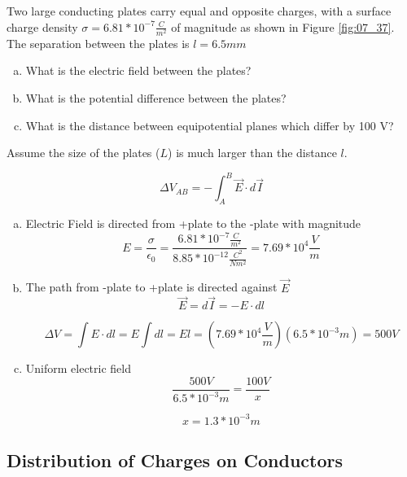 \documentclass[14pt]{memoir}
\begin{document}
Two large conducting plates carry equal and opposite charges, with a surface charge density $\sigma = 6.81 * 10^{-7} \frac{C}{m^2}$ of magnitude as shown in Figure \ref{fig:07_37}. The separation between the plates is $l = 6.5mm$ 
\begin{enumerate}[(a)]
\item What is the electric field between the plates? 
\item What is the potential difference between the plates? 
\item What is the distance between equipotential planes which differ by 100 V?
\end{enumerate}

Assume the size of the plates ($L$) is much larger than the distance $l$.

\begin{equation}
\Delta V_{AB} = - \int_A^B \vec{E} \cdot d\vec{I}
\end{equation}

\begin{enumerate}[(a)]
\item Electric Field is directed from +plate to the -plate with magnitude
	\begin{equation}
	E = \frac{\sigma}{\epsilon_0} = \frac{6.81 * 10^{-7} \frac{C}{m^2}}{8.85 * 10^{-12} \frac{C^2}		{N m^2}} = 7.69 * 10^{4} \frac{V}{m}
	\end{equation}
\item The path from -plate to +plate is directed against $\vec{E}$
	\begin{equation}
	\vec{E} = d\vec{I} = -E \cdot dl
	\end{equation}
	
	\begin{equation}
	\Delta V = \int E \cdot dl = E \int dl = El = (7.69 * 10^{4} \frac{V}{m})(6.5 * 10^{-3}m) = 		500V
	\end{equation}
	
\item Uniform electric field 
	\begin{equation}
	\frac{500V}{6.5 * 10^{-3}m} = \frac{100V}{x}
	\end{equation}
	
	\begin{equation}
	x = 1.3 * 10^{-3}m
	\end{equation}
\end{enumerate}

\subsection{Distribution of Charges on Conductors}
\end{document}
